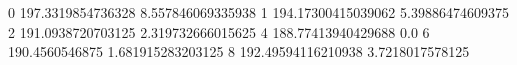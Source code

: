 0 197.3319854736328 8.557846069335938
1 194.17300415039062 5.39886474609375
2 191.0938720703125 2.319732666015625
4 188.77413940429688 0.0
6 190.4560546875 1.681915283203125
8 192.49594116210938 3.7218017578125
